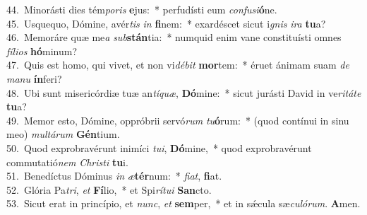 {44.~}Minorásti dies tém\textit{po}\textit{ris} \textbf{e}jus:~* perfudísti eum \textit{con}\textit{fu}\textit{si}\textbf{ó}ne.\\
{45.~}Usquequo, Dómine, avér\textit{tis} \textit{in} \textbf{fi}nem:~* exardéscet sicut i\textit{gnis} \textit{i}\textit{ra} \textbf{tu}a?\\
{46.~}Memoráre quæ me\textit{a} \textit{sub}\textbf{stán}tia:~* numquid enim vane constituísti omnes \textit{fí}\textit{li}\textit{os} \textbf{hó}minum?\\
{47.~}Quis est homo, qui vivet, et non vi\textit{dé}\textit{bit} \textbf{mor}tem:~* éruet ánimam suam \textit{de} \textit{ma}\textit{nu} \textbf{ín}feri?\\
{48.~}Ubi sunt misericórdiæ tuæ an\textit{tí}\textit{quæ}, \textbf{Dó}mine:~* sicut jurásti David in ve\textit{ri}\textit{tá}\textit{te} \textbf{tu}a?\\
{49.~}Memor esto, Dómine, oppróbrii servó\textit{rum} \textit{tu}\textbf{ó}rum:~* (quod contínui in sinu meo) \textit{mul}\textit{tá}\textit{rum} \textbf{Gén}tium.\\
{50.~}Quod exprobravérunt inimíci \textit{tu}\textit{i}, \textbf{Dó}mine,~* quod exprobravérunt commutatió\textit{nem} \textit{Chri}\textit{sti} \textbf{tu}i.\\
{51.~}Benedíctus Dóminus \textit{in} \textit{æ}\textbf{tér}num:~* \textit{fi}\textit{at}, \textbf{fi}at.\\
{52.~}Glória Pa\textit{tri}, \textit{et} \textbf{Fí}lio,~* et Spi\textit{rí}\textit{tu}\textit{i} \textbf{San}cto.\\
{53.~}Sicut erat in princípio, et \textit{nunc}, \textit{et} \textbf{sem}per,~* et in sǽcula sæ\textit{cu}\textit{ló}\textit{rum}. \textbf{A}men.\\
